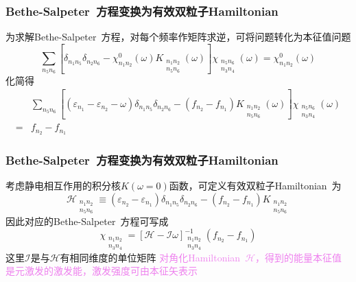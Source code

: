 \documentclass[cjk,slidestop,compress,mathserif,blue]{beamer}
\begin{document}
\frame
{
	\frametitle{\textrm{Bethe-Salpeter~}方程变换为有效双粒子\textrm{Hamiltonian}}
	为求解\textrm{Bethe-Salpeter~}方程，对每个频率作矩阵求逆，可将问题转化为本征值问题
	\begin{displaymath}
		\sum_{n_5n_6}\left[ \delta_{n_1n_5}\delta_{n_2n_6}-\chi_{n_1n_2}^0(\omega)K_{
			\substack{
				n_1 n_2\\
				n_5 n_6
			} }
			(\omega)
			\right]\chi_{ \substack{
			n_5 n_6\\n_3 n_4 
		} }
		(\omega)=\chi_{n_1n_2}^0(\omega)
	\end{displaymath}
	\vskip 20pt
	化简得
	\begin{displaymath}
		\begin{aligned}
			&\sum_{n_5n_6}\left[ (\varepsilon_{n_1}-\varepsilon_{n_2}-\omega)\delta_{n_1n_5}\delta_{n_2n_6}-(f_{n_2}-f_{n_1})K_{
			\substack{
				n_1 n_2\\
				n_5 n_6
			} }
			(\omega)
			\right]\chi_{ \substack{
			n_5 n_6\\n_3 n_4 
		} }
		(\omega)\\
		=&f_{n_2}-f_{n_1}
		\end{aligned}
	\end{displaymath}
}

\frame
{
	\frametitle{\textrm{Bethe-Salpeter~}方程变换为有效双粒子\textrm{Hamiltonian}}
	考虑静电相互作用的积分核$K(\omega=0)$函数，可定义有效双粒子\textrm{Hamiltonian~}为
	\begin{displaymath}
		\mathcal{H}_{
			\substack{
				n_1 n_2\\
				n_5 n_6
			} }\equiv(\varepsilon_{n_2}-\varepsilon_{n_1})\delta_{n_1n_5}\delta_{n_2n_6}-(f_{n_2}-f_{n_1})K_{
			\substack{
				n_1 n_2\\
				n_5 n_6
			} }
	\end{displaymath}
	因此对应的\textrm{Bethe-Salpeter~}方程可写成
	\begin{displaymath}
		\chi_{ \substack{
			n_1 n_2\\n_3 n_4 
		} }=[\mathcal{H}-\mathcal{I}\omega]_{
			\substack{
				n_1 n_2\\
				n_3 n_4
			} }^{-1}(f_{n_2}-f_{n_1})
		\end{displaymath}
		这里$\mathcal{I}$是与$\mathcal{H}$有相同维度的单位矩阵
\vskip 5pt
\textcolor{violet}{对角化\textrm{Hamiltonian~}$\mathcal{H}$，得到的能量本征值是元激发的激发能，激发强度可由本征矢表示}
}
\end{document}
